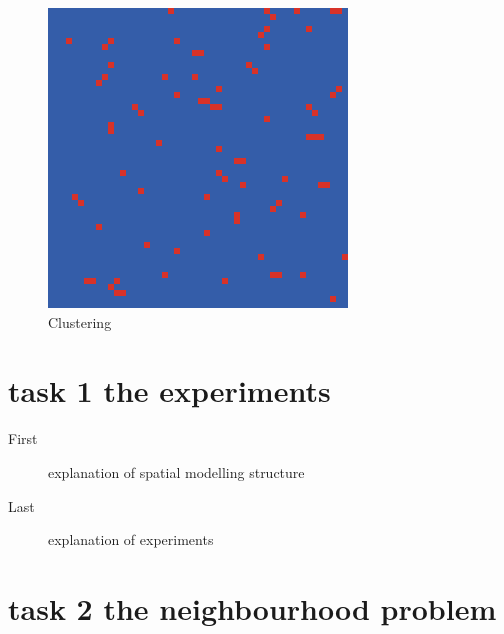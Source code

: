 \documentclass[DIV=calc, paper=a4, fontsize=11pt, twocolumn]{scrartcl}	 %
\begin{document}
\begin{figure}[here]
\centering
\begin{minipage}{.35\textwidth}
  \centering
  \includegraphics[width=1\linewidth]{HDspatial8cost01}
 \caption{Clustering}
\label{fig:PDspatialcluster}
\end{minipage}%
\end{figure}

\section*{task 1 the experiments}


\begin{description}
\item[First] explanation of spatial modelling structure
\item[Last] explanation of experiments
\end{description}

\section*{task 2 the neighbourhood problem}
\end{document}
